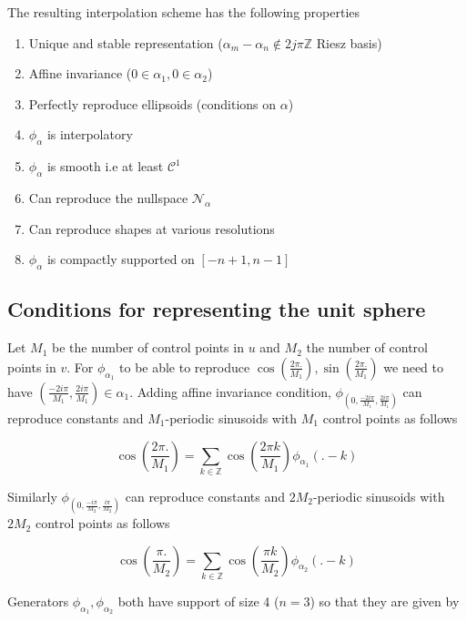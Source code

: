 \documentclass[a4paper, 11pt]{article}
\begin{document}
The resulting interpolation scheme has the following properties
\begin{enumerate}
  \item Unique and stable representation ($\alpha_m - \alpha_n \not\in 2j\pi\mathbb{Z}$ Riesz basis)
  \item Affine invariance ($0 \in \alpha_1, 0 \in \alpha_2$)
  \item Perfectly reproduce ellipsoids (conditions on $\alpha$)
  \item $\phi_{\alpha}$ is interpolatory
  \item $\phi_{\alpha}$ is smooth i.e at least $\mathcal{C}^1$
  \item Can reproduce the nullspace $\mathcal{N}_{\alpha}$
  \item Can reproduce shapes at various resolutions
  \item $\phi_{\alpha}$ is compactly supported on $[-n+1, n-1]$
\end{enumerate}

\subsection{Conditions for representing the unit sphere}

Let $M_1$ be the number of control points in $u$ and $M_2$ the number of control points in $v$. For $\phi_{\alpha_1}$ to 
be able to reproduce $\cos (\frac{2\pi.}{M_1}), \sin (\frac{2\pi.}{M_1})$ we need to have $(\frac{-2i\pi}{M_1}, 
\frac{2i\pi}{M_1}) \in \alpha_1$. Adding affine invariance condition, $\phi_{(0, \frac{-2i\pi}{M_1}, 
\frac{2i\pi}{M_1})}$ can reproduce constants and $M_1$-periodic sinusoids with $M_1$ control points as follows

\begin{equation}
  \cos (\frac{2\pi.}{M_1}) = \sum_{k \in \mathbb{Z}} \cos (\frac{2\pi k}{M_1}) \phi_{\alpha_1}(.-k)
\end{equation}

\clearpage

Similarly $\phi_{(0, \frac{-i\pi}{M_2}, \frac{i\pi}{M_2})}$ can reproduce constants and $2M_2$-periodic sinusoids with 
$2M_2$ control points as follows

\begin{equation}
  \cos (\frac{\pi.}{M_2}) = \sum_{k \in \mathbb{Z}} \cos (\frac{\pi k}{M_2}) \phi_{\alpha_2}(.-k)
\end{equation}

Generators $\phi_{\alpha_1}, \phi_{\alpha_2}$ both have support of size 4 ($n=3$) so that they are given by
\end{document}
